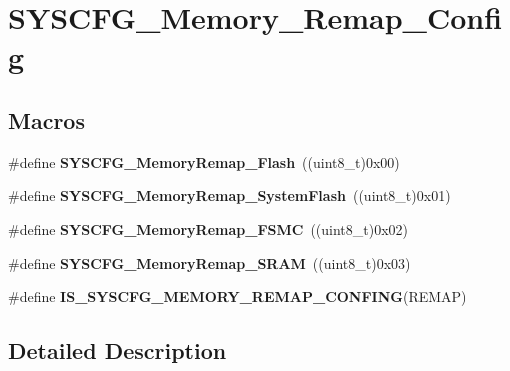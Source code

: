 \hypertarget{group___s_y_s_c_f_g___memory___remap___config}{}\section{S\+Y\+S\+C\+F\+G\+\_\+\+Memory\+\_\+\+Remap\+\_\+\+Config}
\label{group___s_y_s_c_f_g___memory___remap___config}
\subsection*{Macros}
\begin{DoxyCompactItemize}
\item 
\hypertarget{group___s_y_s_c_f_g___memory___remap___config_gaca6b4b48448ddf67fdaa37412a0202ff}{}\#define {\bfseries S\+Y\+S\+C\+F\+G\+\_\+\+Memory\+Remap\+\_\+\+Flash}~((uint8\+\_\+t)0x00)\label{group___s_y_s_c_f_g___memory___remap___config_gaca6b4b48448ddf67fdaa37412a0202ff}

\item 
\hypertarget{group___s_y_s_c_f_g___memory___remap___config_gadabfec4d205f0a25ede0e6ee8ebfcfab}{}\#define {\bfseries S\+Y\+S\+C\+F\+G\+\_\+\+Memory\+Remap\+\_\+\+System\+Flash}~((uint8\+\_\+t)0x01)\label{group___s_y_s_c_f_g___memory___remap___config_gadabfec4d205f0a25ede0e6ee8ebfcfab}

\item 
\hypertarget{group___s_y_s_c_f_g___memory___remap___config_ga7ed56d4bd566e0d97cce3962461673cf}{}\#define {\bfseries S\+Y\+S\+C\+F\+G\+\_\+\+Memory\+Remap\+\_\+\+F\+S\+M\+C}~((uint8\+\_\+t)0x02)\label{group___s_y_s_c_f_g___memory___remap___config_ga7ed56d4bd566e0d97cce3962461673cf}

\item 
\hypertarget{group___s_y_s_c_f_g___memory___remap___config_ga3dc9c7f02f9457d344ffe377df125ee2}{}\#define {\bfseries S\+Y\+S\+C\+F\+G\+\_\+\+Memory\+Remap\+\_\+\+S\+R\+A\+M}~((uint8\+\_\+t)0x03)\label{group___s_y_s_c_f_g___memory___remap___config_ga3dc9c7f02f9457d344ffe377df125ee2}

\item 
\#define {\bfseries I\+S\+\_\+\+S\+Y\+S\+C\+F\+G\+\_\+\+M\+E\+M\+O\+R\+Y\+\_\+\+R\+E\+M\+A\+P\+\_\+\+C\+O\+N\+F\+I\+N\+G}(R\+E\+M\+A\+P)
\end{DoxyCompactItemize}


\subsection{Detailed Description}


